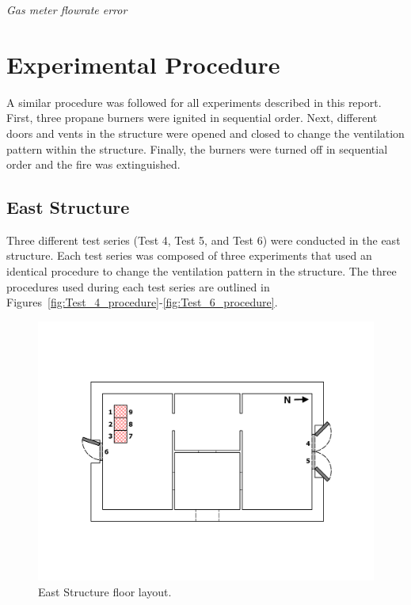 \documentclass[12pt,oneside]{book}
\begin{document}
\textit{Gas meter flowrate error}

\chapter{Experimental Procedure}
\label{chap:Experimental_Procedure}
A similar procedure was followed for all experiments described in this report. First, three propane burners were ignited in sequential order. Next, different doors and vents in the structure were opened and closed to change the ventilation pattern within the structure. Finally, the burners were turned off in sequential order and the fire was extinguished. 

\section{East Structure}
\label{sec:East_exps}
Three different test series (Test 4, Test 5, and Test 6) were conducted in the east structure. Each test series was composed of three experiments that used an identical procedure to change the ventilation pattern in the structure. The three procedures used during each test series are outlined in Figures~\ref{fig:Test_4_procedure}-\ref{fig:Test_6_procedure}.

\begin{figure}[!ht]
	\includegraphics[width=\columnwidth]{../Figures/Floor_Plans/East_Structure_Test_4}
	\caption[Dimensioned floor plan of the East Structure.]{East Structure floor layout.}
	\label{fig:east_test_4}
\end{figure}
\end{document}
